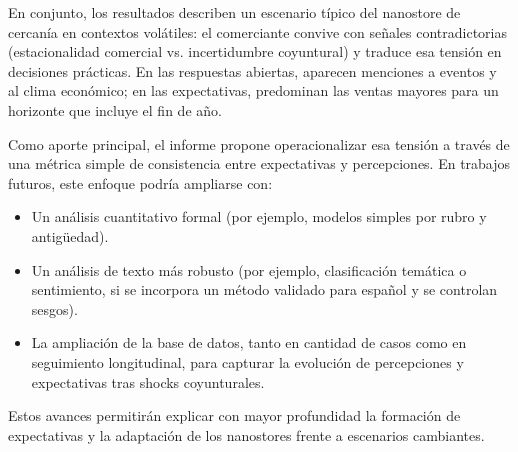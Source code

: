 En conjunto, los resultados describen un escenario típico del nanostore de cercanía en contextos volátiles: el comerciante convive con señales contradictorias (estacionalidad comercial vs. incertidumbre coyuntural) y traduce esa tensión en decisiones prácticas. En las respuestas abiertas, aparecen menciones a eventos y al clima económico; en las expectativas, predominan las ventas mayores para un horizonte que incluye el fin de año.

Como aporte principal, el informe propone operacionalizar esa tensión a través de una métrica simple de consistencia entre expectativas y percepciones. En trabajos futuros, este enfoque podría ampliarse con:

\begin{itemize}
  \item Un análisis cuantitativo formal (por ejemplo, modelos simples por rubro y antigüedad).
  \item Un análisis de texto más robusto (por ejemplo, clasificación temática o sentimiento, si se incorpora un método validado para español y se controlan sesgos).
  \item La ampliación de la base de datos, tanto en cantidad de casos como en seguimiento longitudinal, para capturar la evolución de percepciones y expectativas tras shocks coyunturales.
\end{itemize}

Estos avances permitirán explicar con mayor profundidad la formación de expectativas y la adaptación de los nanostores frente a escenarios cambiantes.
\newpage
